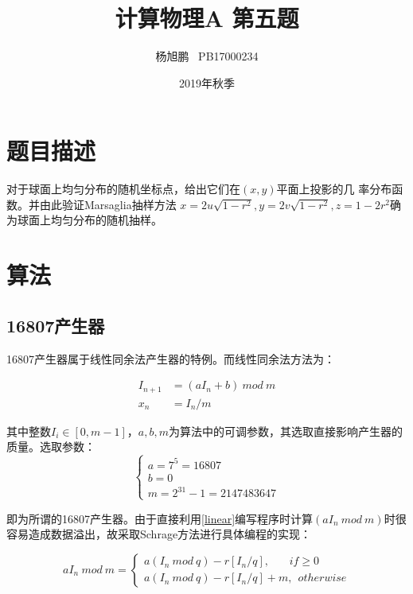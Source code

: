 \documentclass[a4paper,11pt]{article}
\author{ 杨旭鹏  \  PB17000234}
\date{2019年秋季}
\title{计算物理A 第五题}
\begin{document}
\maketitle

\section{题目描述}
对于球面上均匀分布的随机坐标点，给出它们在$(x, y)$平面上投影的几 率分布函数。并由此验证Marsaglia抽样方法 $x = 2u \sqrt{1-r ^{2} }, y = 2v \sqrt{1-r ^{2} } , z = 1 - 2r^{2}  $确为球面上均匀分布的随机抽样。




\section{算法}
\subsection{16807产生器}
16807产生器属于线性同余法产生器的特例。而线性同余法方法为：

\begin{equation}
\begin{aligned}
	I_{n+1} &= (aI_{n} + b) \ mod \ m \\
	x_{n} &= I_{n}/m
\end{aligned}
\label{linear}	
\end{equation}

其中整数$I_{i} \in [0,m-1]$，$a,b,m$为算法中的可调参数，其选取直接影响产生器的质量。选取参数：
\begin{equation}
\left\{
\begin{array}{l}
	a = 7^{5} = 16807 \\
	b = 0 \\
	m = 2^{31}-1 = 2147483647
\end{array}
\right.
\end{equation}

即为所谓的16807产生器。由于直接利用\ref{linear}编写程序时计算$(aI_{n} \ mod \ m )$时很容易造成数据溢出，故采取Schrage方法进行具体编程的实现：

\begin{equation}
	aI_{n} \ mod \ m = \left\{
	\begin{array}{l}
		a(I_{n}\ mod \ q) - r[I_{n}/q],\ \ \ \ \ \ \ \ if \geq 0 \\
		a(I_{n}\ mod \ q) - r[I_{n}/q] + m,\ \ otherwise	
			\end{array}
	\right.
\end{equation}
\end{document}
